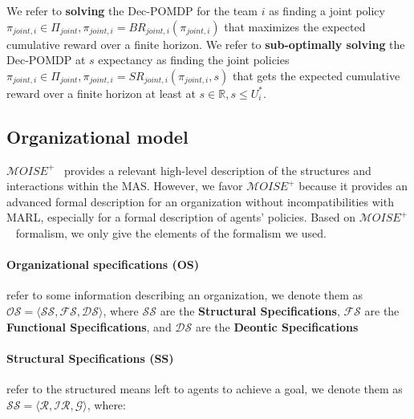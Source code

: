 \documentclass[doubleblind]{ecai}
\begin{document}
We refer to \textbf{solving} the Dec-POMDP for the team $i$ as finding a joint policy $\pi_{joint,i} \in \Pi_{joint}, \pi_{joint,i} = BR_{joint,i}(\pi_{joint,i})$ that maximizes the expected cumulative reward over a finite horizon.
We refer to \textbf{sub-optimally solving} the Dec-POMDP at $s$ expectancy as finding the joint policies $\pi_{joint,i} \in \Pi_{joint}, \pi_{joint,i} = SR_{joint,i}(\pi_{joint,i}, s)$ that gets the expected cumulative reward over a finite horizon at least at $s \in \mathbb{R}, s \leq U_i^*$.


\subsection{Organizational model}

$\mathcal{M}OISE^+$~\citep{Hubner2007} provides a relevant high-level description of the structures and interactions within the MAS. However, we favor $\mathcal{M}OISE^+$ because it provides an advanced formal description for an organization without incompatibilities with MARL, especially for a formal description of agents' policies.
Based on $\mathcal{M}OISE^+$~\citep{Hubner2007} formalism, we only give the elements of the formalism we used.

\paragraph{\textbf{Organizational specifications (OS)}} refer to some information describing an organization, we denote them as $\mathcal{OS} = \langle \mathcal{SS}, \mathcal{FS}, \mathcal{DS} \rangle$, where $\mathcal{SS}$ are the \textbf{Structural Specifications}, $\mathcal{FS}$ are the \textbf{Functional Specifications}, and $\mathcal{DS}$ are the \textbf{Deontic Specifications}

\paragraph{\textbf{Structural Specifications (SS)}} refer to the structured means left to agents to achieve a goal, we denote them as $\mathcal{SS} = \langle \mathcal{R}, \mathcal{IR}, \mathcal{G} \rangle$, where:
\end{document}
